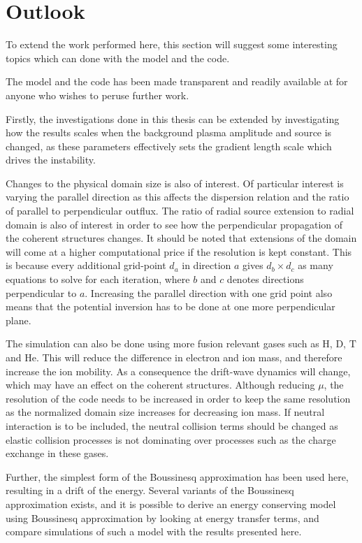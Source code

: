 \section*{Outlook}
%
To extend the work performed here, this section will suggest some interesting topics which can done with the model and the code.

The model and the code has been made transparent and readily available at \celmaProject for anyone who wishes to peruse further work.

Firstly, the investigations done in this thesis can be extended by investigating how the results scales when the background plasma amplitude and source is changed, as these parameters effectively sets the gradient length scale which drives the instability.

Changes to the physical domain size is also of interest.
Of particular interest is varying the parallel direction as this affects the dispersion relation and the ratio of parallel to perpendicular outflux.
The ratio of radial source extension to radial domain is also of interest in order to see how the perpendicular propagation of the coherent structures changes.
It should be noted that extensions of the domain will come at a higher computational price if the resolution is kept constant.
This is because every additional grid-point $d_a$ in direction $a$ gives $d_b\times d_c$ as many equations to solve for each iteration, where $b$ and $c$ denotes directions perpendicular to $a$.
Increasing the parallel direction with one grid point also means that the potential inversion has to be done at one more perpendicular plane.

The simulation can also be done using more fusion relevant gases such as $\text{H}$, $\text{D}$, $\text{T}$ and $\text{He}$.
This will reduce the difference in electron and ion mass, and therefore increase the ion mobility.
As a consequence the drift-wave dynamics will change, which may have an effect on the coherent structures.
Although reducing $\mu$, the resolution of the code needs to be increased in order to keep the same resolution as the normalized domain size increases for decreasing ion mass.
If neutral interaction is to be included, the neutral collision terms should be changed as elastic collision processes is not dominating over processes such as the charge exchange in these gases.

Further, the simplest form of the Boussinesq approximation has been used here, resulting in a drift of the energy.
Several variants of the Boussinesq approximation exists, and it is possible to derive an energy conserving model using Boussinesq approximation by looking at energy transfer terms, and compare simulations of such a model with the results presented here.

